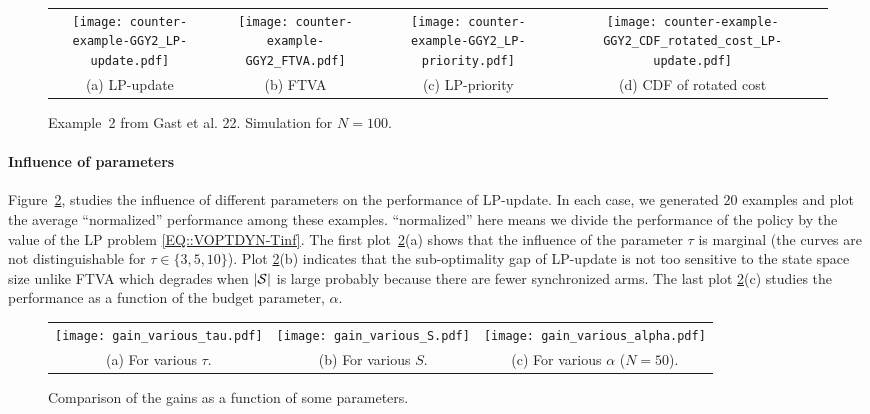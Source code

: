 \begin{figure}[ht]
    \centering
    \begin{tabular}{@{}c@{}c@{}c@{}c@{}}
        \texttt{[image: counter-example-GGY2\_LP-update.pdf]}
        &\texttt{[image: counter-example-GGY2\_FTVA.pdf]}
        &\texttt{[image: counter-example-GGY2\_LP-priority.pdf]}
        &\texttt{[image: counter-example-GGY2\_CDF\_rotated\_cost\_LP-update.pdf]}\\
        (a) LP-update
        &(b) FTVA
        &(c) LP-priority        
        &(d) CDF of rotated cost
    \end{tabular}

    \caption{Example~2 from Gast et al. 22. Simulation for $N=100$.}

    \label{fig:example-chen}
\end{figure}

\paragraph{Influence of parameters} Figure~\ref{fig:gain_function_parameters}, studies the influence of different parameters on the performance of LP-update. In each case, we generated $20$ examples and plot the average ``normalized'' performance among these examples. %
``normalized'' here means we divide the performance of the policy by the value of the LP problem \eqref{EQ::VOPTDYN-Tinf}. The first plot~\ref{fig:gain_function_parameters}(a) shows that the influence of the parameter $\tau$ is marginal (the curves are not distinguishable for $\tau\in\{3,5,10\}$).  Plot \ref{fig:gain_function_parameters}(b) indicates that the sub-optimality gap of LP-update is not too sensitive to the state space size unlike FTVA which degrades when $|\mathcal{S}|$ is large probably because there are fewer synchronized arms. The last plot \ref{fig:gain_function_parameters}(c) studies the performance as a function of the budget parameter, $\alpha$. 
\begin{figure}[t]
    \centering
    \begin{tabular}{@{}c@{}c@{}c@{}}
        \texttt{[image: gain\_various\_tau.pdf]}
        &\texttt{[image: gain\_various\_S.pdf]}
        &\texttt{[image: gain\_various\_alpha.pdf]}\\
        (a) For various $\tau$.
        &(b) For various $S$.
        &(c) For various $\alpha$ ($N=50$).
    \end{tabular}

    \caption{Comparison of the gains as a function of some parameters.}
    \label{fig:gain_function_parameters}
\end{figure}